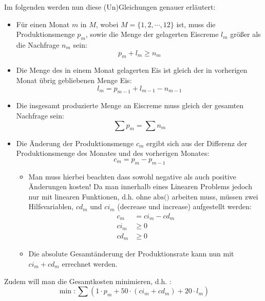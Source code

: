 Im folgenden werden nun diese (Un)Gleichungen genauer erläutert:

\begin{itemize}
\item Für einen Monat $m$ in $M$, wobei $M = \{1, 2, \cdots, 12\}$ ist, muss die Produktionsmenge $p_m$, sowie die Menge der gelagerten Eiscreme $l_m$ größer als die Nachfrage $n_m$ sein:
\[ p_m + l_m \geq n_m \]
\item Die Menge des in einem Monat gelagerten Eis ist gleich der in vorherigen Monat übrig gebliebenen Menge Eis:
\[ l_m = p_{m-1} + l_{m-1} - n_{m-1} \]
\item Die insgesamt produzierte Menge an Eiscreme muss gleich der gesamten Nachfrage sein:
\[ \sum p_m = \sum n_m \]
\item Die Änderung der Produktionsmenge $c_m$ ergibt sich aus der Differenz der Produktionsmenge des Monates und des vorherigen Monates: 
\[ c_m = p_{m} - p_{m-1} \] 
	\begin{itemize}
	\item Man muss hierbei beachten dass sowohl negative als auch positive Änderungen kosten! Da man innerhalb eines Linearen Problems jedoch nur mit linearen Funktionen, d.h. ohne $\text{abs()}$ arbeiten muss, müssen zwei Hilfsvariablen, $cd_m$ und $ci_m$ (decrease und increase) aufgestellt werden:
	\begin{align*}
	c_m &= ci_m - cd_m \\
	ci_m &\geq 0		\\
	cd_m &\geq 0
	\end{align*}
	
	\item Die absolute Gesamtänderung der Produktionsrate kann nun mit $ci_m + cd_m$ errechnet werden.
 	\end{itemize}
\end{itemize}

Zudem will man die Gesamtkosten minimieren, d.h. :
\[ \min: \sum (1 \cdot p_m + 50 \cdot (ci_m + cd_m) + 20 \cdot l_m)\]